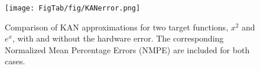 \begin{figure}[t]
\centering
\texttt{[image: FigTab/fig/KANerror.png]}
\caption{Comparison of KAN approximations for two target functions, $x^2$ and $e^x$, with and without the hardware error. The corresponding Normalized Mean Percentage Errors (NMPE) are included for both cases.}\label{fig:KANerror}
\vspace{-2ex}
\end{figure}
